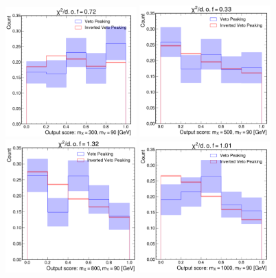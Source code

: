 \begin{figure}
  \centering
  \includegraphics[width=0.45\textwidth]{Figures/Dihiggs/background/dy/output_score_300.pdf}\hspace{0.05\textwidth}
  \includegraphics[width=0.45\textwidth]{Figures/Dihiggs/background/dy/output_score_500.pdf}\vspace{0.05\textwidth}
  \includegraphics[width=0.45\textwidth]{Figures/Dihiggs/background/dy/output_score_800.pdf}\hspace{0.05\textwidth}
  \includegraphics[width=0.45\textwidth]{Figures/Dihiggs/background/dy/output_score_1000.pdf}

\end{figure}
